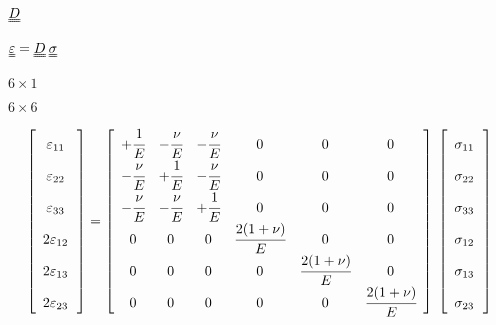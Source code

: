 \documentclass[onecolumn,11pt]{report}
\def\lthtmlcheckvsize{\ifdim\ht\sizebox<\vsize 
  \ifdim\wd\sizebox<\hsize\expandafter\hfill\fi \expandafter\vfill
  \else\expandafter\vss\fi}%
\begin{document}
{\newpage\clearpage
{}%
$ \uuline{D}$%
\lthtmlindisplaymathZ
\lthtmlcheckvsize\clearpage}

{\newpage\clearpage
{}%
$\displaystyle \uuline{\varepsilon} = \uuline{D} \: \uuline{\sigma}$%
\lthtmlindisplaymathZ
\lthtmlcheckvsize\clearpage}

{\newpage\clearpage
{}%
$ 6 \times 1$%
\lthtmlindisplaymathZ
\lthtmlcheckvsize\clearpage}

{\newpage\clearpage
{}%
$ 6 \times 6$%
\lthtmlindisplaymathZ
\lthtmlcheckvsize\clearpage}

{\newpage\clearpage
{}%
\begin{displaymath}%
	\left[
\begin{array} {c}
\varepsilon_{11} \cfrac{}{}\\
\varepsilon_{22} \cfrac{}{}\\
\varepsilon_{33} \cfrac{}{}\\
2 \varepsilon_{12} \cfrac{}{}\\
2 \varepsilon_{13} \cfrac{}{}\\
2 \varepsilon_{23} \cfrac{}{}
\end{array}
\right] =
\left[
\begin{array}{cccccc}
+\cfrac{1}{E} & -\cfrac{\nu}{E} & -\cfrac{\nu}{E} & 0 & 0 & 0\\
-\cfrac{\nu}{E} & +\cfrac{1}{E} & -\cfrac{\nu}{E} & 0 & 0 & 0\\
-\cfrac{\nu}{E} & -\cfrac{\nu}{E} & +\cfrac{1}{E} & 0 & 0 & 0\\
0 & 0 & 0 & \cfrac{2(1+\nu)}{E} & 0 & 0 \\
0 & 0 & 0 & 0 & \cfrac{2(1+\nu)}{E} & 0 \\
0 & 0 & 0 & 0 & 0 & \cfrac{2(1+\nu)}{E}
\end{array}
\right] \:
\left[
\begin{array} {c}
\sigma_{11} \cfrac{}{}\\
\sigma_{22} \cfrac{}{}\\
\sigma_{33} \cfrac{}{}\\
\sigma_{12} \cfrac{}{}\\
\sigma_{13} \cfrac{}{}\\
\sigma_{23} \cfrac{}{}
\end{array}
\right]\end{displaymath}%
\lthtmldisplayZ
\lthtmlcheckvsize\clearpage}
\end{document}
